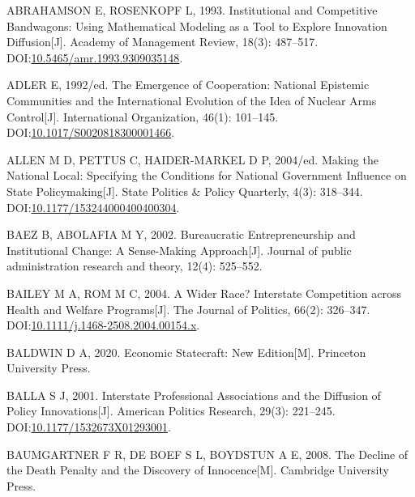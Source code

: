 \documentclass[
  12pt,
]{ctexart}
\newlength{\cslhangindent}
\newlength{\cslentryspacingunit} %
\newenvironment{CSLReferences}[2] %
 {%
  \setlength{\parindent}{0pt}
  \ifodd #1
  \let\oldpar\par
  \def\par{\hangindent=\cslhangindent\oldpar}
  \fi
  \setlength{\parskip}{#2\cslentryspacingunit}
 }%
 {}
\begin{document}
\hypertarget{refs}{}
\begin{CSLReferences}{1}{0}
\leavevmode{}%
ABRAHAMSON E, ROSENKOPF L, 1993. Institutional and Competitive Bandwagons: Using Mathematical Modeling as a Tool to Explore Innovation Diffusion{[}J{]}. Academy of Management Review, 18(3): 487--517. DOI:\href{https://doi.org/10.5465/amr.1993.9309035148}{10.5465/amr.1993.9309035148}.

\leavevmode{}%
ADLER E, 1992/ed. The Emergence of Cooperation: National Epistemic Communities and the International Evolution of the Idea of Nuclear Arms Control{[}J{]}. International Organization, 46(1): 101--145. DOI:\href{https://doi.org/10.1017/S0020818300001466}{10.1017/S0020818300001466}.

\leavevmode{}%
ALLEN M D, PETTUS C, HAIDER-MARKEL D P, 2004/ed. Making the {National Local}: {Specifying} the {Conditions} for {National Government Influence} on {State Policymaking}{[}J{]}. State Politics \& Policy Quarterly, 4(3): 318--344. DOI:\href{https://doi.org/10.1177/153244000400400304}{10.1177/153244000400400304}.

\leavevmode{}%
BAEZ B, ABOLAFIA M Y, 2002. Bureaucratic Entrepreneurship and Institutional Change: A Sense-Making Approach{[}J{]}. Journal of public administration research and theory, 12(4): 525--552.

\leavevmode{}%
BAILEY M A, ROM M C, 2004. A {Wider Race}? {Interstate Competition} across {Health} and {Welfare Programs}{[}J{]}. The Journal of Politics, 66(2): 326--347. DOI:\href{https://doi.org/10.1111/j.1468-2508.2004.00154.x}{10.1111/j.1468-2508.2004.00154.x}.

\leavevmode{}%
BALDWIN D A, 2020. Economic {Statecraft}: {New Edition}{[}M{]}. {Princeton University Press}.

\leavevmode{}%
BALLA S J, 2001. Interstate {Professional Associations} and the {Diffusion} of {Policy Innovations}{[}J{]}. American Politics Research, 29(3): 221--245. DOI:\href{https://doi.org/10.1177/1532673X01293001}{10.1177/1532673X01293001}.

\leavevmode{}%
BAUMGARTNER F R, DE BOEF S L, BOYDSTUN A E, 2008. The Decline of the Death Penalty and the Discovery of Innocence{[}M{]}. {Cambridge University Press}.


\end{CSLReferences}
\end{document}
